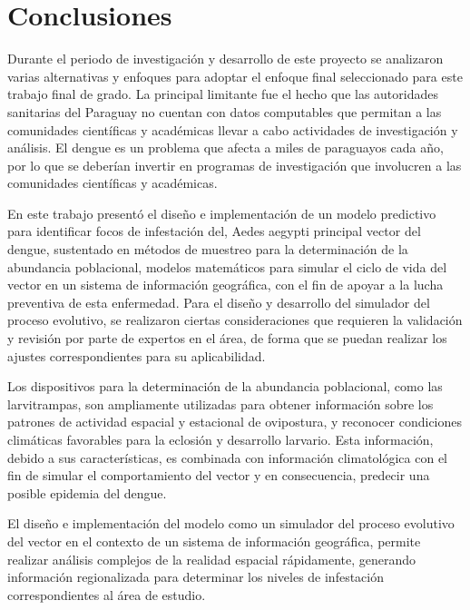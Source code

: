 \chapter{Conclusiones}
Durante el periodo de investigación y desarrollo de este proyecto se analizaron varias
alternativas y enfoques para adoptar el enfoque final seleccionado para este trabajo final de grado. La principal limitante fue el hecho que las autoridades sanitarias del Paraguay no cuentan con
datos computables que permitan a las comunidades científicas y académicas llevar a cabo actividades de investigación y análisis. El dengue es un problema que afecta a miles de paraguayos cada año, por lo que se deberían invertir en programas de investigación que involucren a las comunidades científicas y académicas.

En este trabajo presentó el diseño e implementación de un modelo predictivo para identificar focos
de infestación del, Aedes aegypti principal vector del dengue, sustentado en métodos de muestreo
para la determinación de la abundancia poblacional, modelos matemáticos para simular el ciclo de
vida del vector en un sistema de información geográfica, con el fin de apoyar a la lucha
preventiva de esta enfermedad. Para el diseño y desarrollo del simulador del proceso evolutivo, se
realizaron ciertas consideraciones que requieren la validación y revisión por parte de expertos en
el área, de forma que se puedan realizar los ajustes correspondientes para su aplicabilidad.

Los dispositivos para la determinación de la abundancia poblacional, como las larvitrampas, son
ampliamente utilizadas para obtener información sobre los patrones de actividad espacial y
estacional de ovipostura, y reconocer condiciones climáticas favorables para la eclosión y
desarrollo larvario. Esta información, debido a sus características, es combinada con información
climatológica con el fin de simular el comportamiento del vector y en consecuencia, predecir una
posible epidemia del dengue.

El diseño e implementación del modelo como un simulador del proceso evolutivo del vector en el
contexto de un sistema de información geográfica, permite realizar análisis complejos de la
realidad espacial rápidamente, generando información regionalizada para determinar los niveles de
infestación correspondientes al área de estudio.

